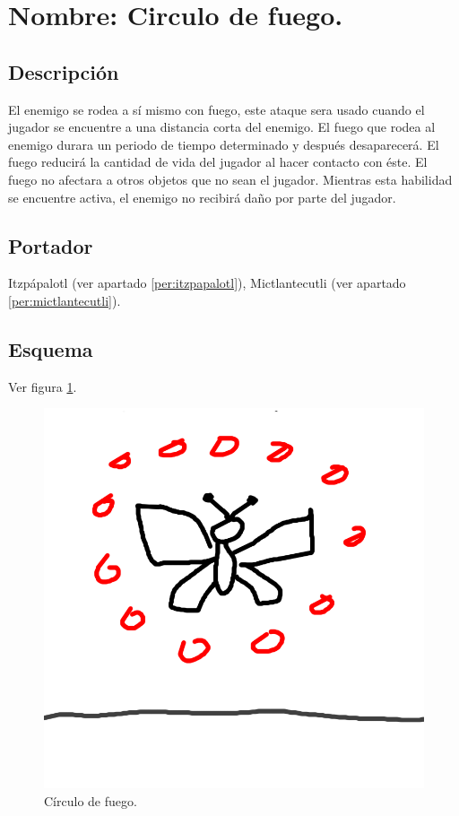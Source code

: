 \section{Nombre: Circulo de fuego.} \label{hab.CirFue}
\subsection{Descripción}
El enemigo se rodea a sí mismo con fuego, este ataque sera usado cuando el jugador se encuentre a una distancia corta del enemigo. El fuego que rodea al enemigo durara un periodo de tiempo determinado y después desaparecerá. El fuego reducirá la cantidad de vida del jugador al hacer contacto con éste. El fuego no afectara a otros objetos que no sean el jugador. Mientras esta habilidad se encuentre activa, el enemigo no recibirá daño por parte del jugador.
\subsection{Portador}
Itzpápalotl (ver apartado \ref{per:itzpapalotl}),  Mictlantecutli (ver apartado \ref{per:mictlantecutli}). 
\subsection{Esquema}
			Ver figura \ref{fig:circuloF}.
			\begin{figure}
				\centering
				\includegraphics[height=0.2 \textheight]{Imagenes/circuloF}
				\caption{Círculo de fuego.}
				\label{fig:circuloF}
			\end{figure}
			
